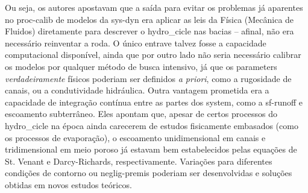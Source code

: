 \documentclass[./main.tex]{subfiles}
\begin{document}
\noindent Ou seja, os autores apostavam que a saída para evitar os problemas já aparentes no \gls{proc-calib} de modelos da \gls{sys-dyn} era aplicar as leis da Física (Mecânica de Fluidos) diretamente para descrever o \gls{hydro_cicle} nas bacias -- afinal, não era necessário reinventar a roda. O único entrave talvez fosse a capacidade computacional disponível, ainda que por outro lado não seria necessário calibrar os modelos por qualquer método de busca intensivo, já que os \gls{parameters} \textit{verdadeiramente} físicos poderiam ser definidos \textit{a priori}, como a rugosidade de canais, ou a condutividade hidráulica. Outra vantagem prometida era a capacidade de integração contínua entre as partes dos \gls{system}, como a \gls{sf-runoff} e escoamento subterrâneo. Eles apontam que, apesar de certos processos do \gls{hydro_cicle} na época ainda carecerem de estudos fisicamente embasados (como os processos de evaporação), o escoamento unidimensional em canais e tridimensional em meio poroso já estavam bem estabelecidos pelas equações de St. Venant e Darcy-Richards, respectivamente. Variações para diferentes condições de contorno ou \gls{neglig-premis} poderiam ser desenvolvidas e soluções obtidas em novos estudos teóricos.
\end{document}
